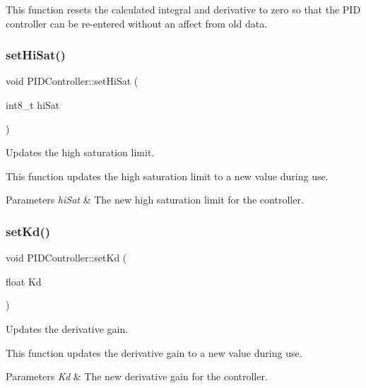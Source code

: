 This function resets the calculated integral and derivative to zero so that the P\+ID controller can be re-\/entered without an affect from old data. \mbox{\label{class_p_i_d_controller_ad71f9567e88aabf607375c0f5c513a92}} 
\subsubsection{\texorpdfstring{set\+Hi\+Sat()}{setHiSat()}}
{\footnotesize\ttfamily void P\+I\+D\+Controller\+::set\+Hi\+Sat (\begin{DoxyParamCaption}\item[{int8\+\_\+t}]{hi\+Sat }\end{DoxyParamCaption})}



Updates the high saturation limit. 

This function updates the high saturation limit to a new value during use. 
\begin{DoxyParams}{Parameters}
{\em hi\+Sat} & The new high saturation limit for the controller. \\
\hline
\end{DoxyParams}
\mbox{\label{class_p_i_d_controller_aa6fd9ebf0835ad90a20f38df6615e1f3}} 
\subsubsection{\texorpdfstring{set\+Kd()}{setKd()}}
{\footnotesize\ttfamily void P\+I\+D\+Controller\+::set\+Kd (\begin{DoxyParamCaption}\item[{float}]{Kd }\end{DoxyParamCaption})}



Updates the derivative gain. 

This function updates the derivative gain to a new value during use. 
\begin{DoxyParams}{Parameters}
{\em Kd} & The new derivative gain for the controller. \\
\hline
\end{DoxyParams}
\mbox{\label{class_p_i_d_controller_a8d9a587dbc3d2432e6927551402d81d7}} 
